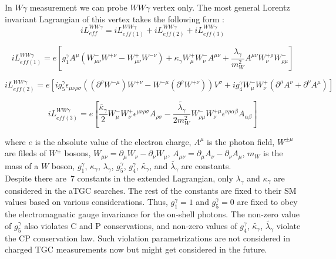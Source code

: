 In $W\gamma$ measurement we can probe $WW\gamma$ vertex only. The most general Lorentz invariant Lagrangian of this vertex takes the following form \cite{ref_theory_aTGC}:\\

\begin{equation}\label{L_ATGC}
i L_{eff}^{WW\gamma}= i L_{eff(1)}^{WW\gamma} + i L_{eff(2)}^{WW\gamma} + i L_{eff(3)}^{WW\gamma}
\end{equation}


\begin{equation}\label{L_ATGC_1}
i L_{eff(1)}^{WW\gamma}= e [ g_1^{\gamma} A^\mu (W_{\mu\nu}^- W^{+\nu} - W_{\mu\nu}^+ W^{-\nu}) + \kappa_\gamma W_{\mu}^+ W_{\nu}^- A^{\mu\nu} + {\frac{\lambda_\gamma}{m^2_W}} A^{\mu\nu} W_\nu^{+\rho} W_{\rho\mu}^- ]
\end{equation}

\begin{equation}\label{L_ATGC_2}
i L_{eff(2)}^{WW\gamma}= e [ i g_5^\gamma \epsilon_{\mu\nu\rho\sigma}((\partial^\rho W^{-\mu})W^{+\nu} - W^{-\mu}(\partial^{\rho}W^{+\nu}))V^\sigma + i g_4^\gamma W_\mu^- W_\nu^+ (\partial^\mu A^\nu + \partial^\nu A^\mu) ]
\end{equation}

\begin{equation}\label{L_ATGC_3}
i L_{eff(3)}^{WW\gamma}= e [ \frac{\tilde{\kappa_\gamma}}{2} W_\mu^- W_\nu^+ \epsilon^{\mu\nu\rho\sigma} A_{\rho\sigma} - \frac{\tilde{\lambda_\gamma}}{2 m_W^2} W_{\rho\mu}^- W^{+\mu}_{\nu} \epsilon^{\nu\rho\alpha\beta} A_{\alpha\beta}]
\end{equation}


where $e$ is the absolute value of the electron charge, $A^\mu$ is the photon field, $W^{\pm\mu}$ are fileds of $W^\pm$ bosons, $W_{\mu\nu}=\partial_\mu W_\nu - \partial_\nu W_\mu$, $A_{\mu\nu}=\partial_\mu A_\nu - \partial_\nu A_\mu$, $m_W$ is the mass of a $W$ boson, $g_1^\gamma$, $\kappa_\gamma$, $\lambda_\gamma$, $g_5^\gamma$, $g_4^\gamma$, $\tilde{\kappa_\gamma}$, and $\tilde{\lambda_\gamma}$ are constants.\\

Despite there are~7 constants in the extended Lagrangian, only $\lambda_\gamma$ and $\kappa_\gamma$ are considered in the aTGC searches. The rest of the constants are fixed to their SM values based on various considerations. Thus, $g_1^\gamma=1$ and $g_5^\gamma=0$ are fixed to obey the electromagnatic gauge invariance for the on-shell photons. The non-zero value of $g_5^\gamma$ also violates C and P conservations, and non-zero values of $g_4^\gamma$, $\tilde{\kappa_\gamma}$, $\tilde{\lambda_\gamma}$ violate the CP conservation law. Such violation parametrizations are not considered in charged TGC measurements now but might get considered in the future.\\

